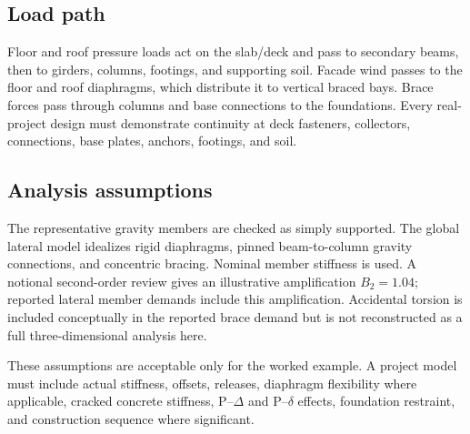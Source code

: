 \subsection{Load path}
Floor and roof pressure loads act on the slab/deck and pass to secondary beams, then
to girders, columns, footings, and supporting soil. Facade wind passes to the floor
and roof diaphragms, which distribute it to vertical braced bays. Brace forces pass
through columns and base connections to the foundations. Every real-project design
must demonstrate continuity at deck fasteners, collectors, connections, base plates,
anchors, footings, and soil.

\subsection{Analysis assumptions}
\label{sec:analysis}
The representative gravity members are checked as simply supported. The global
lateral model idealizes rigid diaphragms, pinned beam-to-column gravity connections,
and concentric bracing. Nominal member stiffness is used. A notional second-order
review gives an illustrative amplification $B_2=1.04$; reported lateral member
demands include this amplification. Accidental torsion is included conceptually in
the reported brace demand but is not reconstructed as a full three-dimensional
analysis here.

These assumptions are acceptable only for the worked example. A project model must
include actual stiffness, offsets, releases, diaphragm flexibility where applicable,
cracked concrete stiffness, P--$\Delta$ and P--$\delta$ effects, foundation restraint,
and construction sequence where significant.

